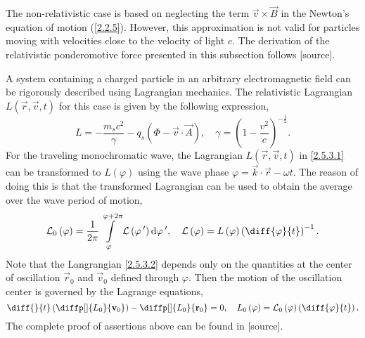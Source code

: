 The non-relativistic case is based on neglecting the term $ \vec{v} \times \vec{B} $ in the Newton's equation of motion (\ref{2.2.5}). However, this approximation is not valid for particles moving with velocities close to the velocity of light $ c $. The derivation of the relativistic ponderomotive force presented in this subsection follows [source].

A system containing a charged particle in an arbitrary electromagnetic field can be rigorously described using Lagrangian mechanics. The relativistic Lagrangian $ L \left( \vec{r}, \vec{v}, t \right)  $ for this case is given by the following expression,
\begin{equation}
\label{2.5.3.1}
L = -\frac{m_s c^2}{\gamma} - q_s \left(\Phi - \vec{v} \cdot \vec{A} \right), \quad \gamma = \left( 1 - \frac{v^{2}}{c} \right)^{-\frac{1}{2}}.
\end{equation}
For the traveling monochromatic wave, the Lagrangian $ L \left( \vec{r}, \vec{v}, t \right)  $ in \ref{2.5.3.1} can be transformed to $ L \left( \varphi \right)  $ using the wave phase $ \varphi = \vec{k} \cdot \vec{r} - \omega t $. The reason of doing this is that the transformed Lagrangian can be used to obtain the average over the wave period of motion,
\begin{equation}
\label{2.5.3.2}
\mathcal{L}_0 \left( \varphi \right) = \frac{1}{2 \pi} \int \limits_{\varphi}^{\varphi + 2\pi} \mathcal{L} \left( \varphi^{\: \prime} \right) \mathrm{d} \varphi^{\: \prime}, \quad \mathcal{L} \left( \varphi \right) = L \left( \varphi \right) \left( \diff{\varphi}{t} \right)^{-1}.
\end{equation}
Note that the Langrangian \ref{2.5.3.2} depends only on the quantities at the center of oscillation $ \vec{r}_0 $ and $ \vec{v}_0 $ defined through $ \varphi $. Then the motion of the oscillation center is governed by the Lagrange equations,
\begin{equation}
\label{2.5.3.3}
\diff{}{t} \left( \diffp[]{L_0}{\vec{v}_0} \right) -  \diffp[]{L_0}{\vec{r}_0} = 0, \quad L_0 \left( \varphi \right) = \mathcal{L}_0 \left( \varphi \right) \left( \diff{\varphi}{t} \right).
\end{equation}
The complete proof of assertions above can be found in [source].

